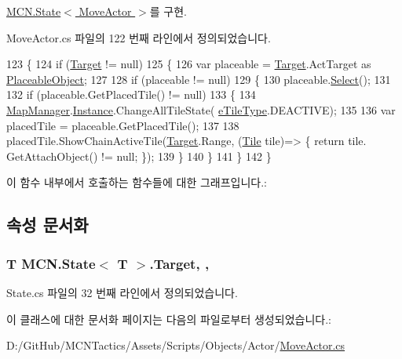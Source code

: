 \hyperlink{class_m_c_n_1_1_state_a8adfea67c55997e5c0eefbae1e429f4d}{M\+C\+N.\+State$<$ Move\+Actor $>$}를 구현.



Move\+Actor.\+cs 파일의 122 번째 라인에서 정의되었습니다.


\begin{DoxyCode}
123         \{
124             \textcolor{keywordflow}{if} (\hyperlink{class_m_c_n_1_1_state_a93ba2fd920292031bd6e65b1dc505cb3}{Target} != null)
125             \{
126                 var placeable = \hyperlink{class_m_c_n_1_1_state_a93ba2fd920292031bd6e65b1dc505cb3}{Target}.ActTarget as \hyperlink{class_placeable_object}{PlaceableObject};
127 
128                 \textcolor{keywordflow}{if} (placeable != null)
129                 \{
130                     placeable.\hyperlink{class_placeable_object_a019818f3f6c6eb715fed163efa921f5a}{Select}();
131 
132                     \textcolor{keywordflow}{if} (placeable.GetPlacedTile() != null)
133                     \{
134                         \hyperlink{class_map_manager}{MapManager}.\hyperlink{class_m_c_n_1_1_mono_singletone_aa50c027cca64cf4ad30c1ee5c83e0b78}{Instance}.ChangeAllTileState(
      \hyperlink{_tile_8cs_a271bc07be325bca511bcb747e0ff2fda}{eTileType}.DEACTIVE);
135 
136                         var placedTile = placeable.GetPlacedTile();
137 
138                         placedTile.ShowChainActiveTile(\hyperlink{class_m_c_n_1_1_state_a93ba2fd920292031bd6e65b1dc505cb3}{Target}.Range, (\hyperlink{class_tile}{Tile} tile)=> \{ return tile.
      GetAttachObject() != null; \});
139                     \}
140                 \}
141             \}
142         \}
\end{DoxyCode}


이 함수 내부에서 호출하는 함수들에 대한 그래프입니다.\+:




\subsection{속성 문서화}
\subsubsection[{\texorpdfstring{Target}{Target}}]{\setlength{\rightskip}{0pt plus 5cm}T {\bf M\+C\+N.\+State}$<$ T $>$.Target\hspace{0.3cm}{\ttfamily [get]}, {\ttfamily [protected]}, {\ttfamily [inherited]}}\hypertarget{class_m_c_n_1_1_state_a93ba2fd920292031bd6e65b1dc505cb3}{}\label{class_m_c_n_1_1_state_a93ba2fd920292031bd6e65b1dc505cb3}


State.\+cs 파일의 32 번째 라인에서 정의되었습니다.



이 클래스에 대한 문서화 페이지는 다음의 파일로부터 생성되었습니다.\+:\begin{DoxyCompactItemize}
\item 
D\+:/\+Git\+Hub/\+M\+C\+N\+Tactics/\+Assets/\+Scripts/\+Objects/\+Actor/\hyperlink{_move_actor_8cs}{Move\+Actor.\+cs}\end{DoxyCompactItemize}
